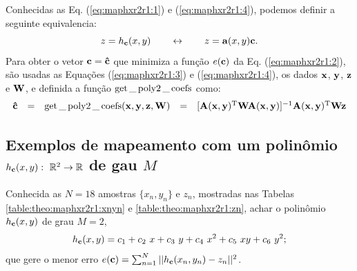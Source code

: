 \begin{corollary}\label{coro:maphxr2r1}
Conhecidas as Eq. (\ref{eq:maphxr2r1:1}) e (\ref{eq:maphxr2r1:4}), podemos definir a seguinte equivalencia:
\begin{equation}
z = h_{\VECTOR{c}}(x,y)\qquad \leftrightarrow  \qquad z = \VECTOR{a}(x,y)\VECTOR{c}.
\end{equation}
Para obter o vetor $\VECTOR{c}=\VECTOR{\hat{c}}$ que minimiza a função $e(\VECTOR{c})$
da Eq. (\ref{eq:maphxr2r1:2}), 
são usadas as Equações (\ref{eq:maphxr2r1:3}) e (\ref{eq:maphxr2r1:4}),
os dados $\VECTOR{x}$, $\VECTOR{y}$, $\VECTOR{z}$ e $\MATRIX{w}$, e definida
a função $\operatorname{get}\_\operatorname{poly2}\_\operatorname{coefs}$ como:
\begin{equation}
\begin{array}{lllll}
\VECTOR{\hat{c}} & = & 
\getminparam (\VECTOR{x},\VECTOR{y},\VECTOR{z},\MATRIX{W}) & = & 
[\MATRIX{A}(\VECTOR{x},\VECTOR{y})^{\transpose}\MATRIX{W}\MATRIX{A}(\VECTOR{x},\VECTOR{y})]^{-1}\MATRIX{A}(\VECTOR{x},\VECTOR{y})^{\transpose}\MATRIX{W}\VECTOR{z}
\end{array}
\end{equation}
\end{corollary}

\subsection{Exemplos de mapeamento com um polinômio
$h_{\VECTOR{c}}(x,y):~\mathbb{R}^2 \rightarrow \mathbb{R}$ de gau $M$ }

\begin{example}\label{ex:theo:maphxr2r1}
Conhecida as $N=18$ amostras $\{x_n,y_n\}$ e $z_n$, 
mostradas nas  Tabelas \ref{table:theo:maphxr2r1:xnyn} e \ref{table:theo:maphxr2r1:zn},
achar o polinômio $h_{\VECTOR{c}}(x,y)$ de grau $M=2$,
\begin{equation}
h_{\VECTOR{c}}(x,y) = c_{1}+c_{2}~x + c_{3}~y +c_{4}~x^2 +c_{5}~xy + c_{6}~y^2;
\end{equation} 
que gere o menor erro $e(\VECTOR{c}) =  \sum_{n=1}^{N} ||h_{\VECTOR{c}}(x_n,y_n)-z_n||^2$.
\end{example}


